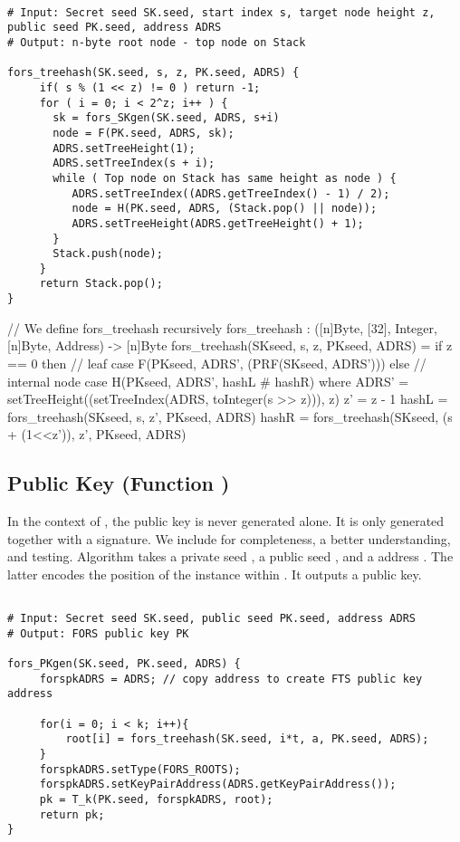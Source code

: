    \begin{lstlisting}[breaklines=true, label=algo:forstreehash, language=pseudoc,
                   caption=The \forstreehash algorithm.]

# Input: Secret seed SK.seed, start index s, target node height z, public seed PK.seed, address ADRS
# Output: n-byte root node - top node on Stack

fors_treehash(SK.seed, s, z, PK.seed, ADRS) {
     if( s % (1 << z) != 0 ) return -1;
     for ( i = 0; i < 2^z; i++ ) {
       sk = fors_SKgen(SK.seed, ADRS, s+i)
       node = F(PK.seed, ADRS, sk);
       ADRS.setTreeHeight(1);
       ADRS.setTreeIndex(s + i);
       while ( Top node on Stack has same height as node ) {
          ADRS.setTreeIndex((ADRS.getTreeIndex() - 1) / 2);
          node = H(PK.seed, ADRS, (Stack.pop() || node));
          ADRS.setTreeHeight(ADRS.getTreeHeight() + 1);
       }
       Stack.push(node);
     }
     return Stack.pop();
}

\end{lstlisting}

\begin{code}
  // We define fors_treehash recursively
  fors_treehash : ([n]Byte, [32], Integer, [n]Byte, Address) -> [n]Byte
  fors_treehash(SKseed, s, z, PKseed, ADRS) =
    if z == 0 then
    // leaf case
      F(PKseed, ADRS', (PRF(SKseed, ADRS')))
    else
      // internal node case
      H(PKseed, ADRS', hashL # hashR)
    where
      ADRS' = setTreeHeight((setTreeIndex(ADRS, toInteger(s >> z))), z)
      z' = z - 1
      hashL = fors_treehash(SKseed, s, z', PKseed, ADRS)
      hashR = fors_treehash(SKseed, (s + (1<<z')), z', PKseed, ADRS)
\end{code}

\subsection{\fors Public Key (Function \forspkgen)}
In the context of \spx, the \fors public key is never generated alone. It is
only generated together with a signature. We include \forspkgen
for completeness, a better understanding, and testing. Algorithm \forspkgen takes
a private seed \sseed, a public seed \pseed, and a \fors address \adrs. The
latter encodes the position of the \fors instance within \spx. It outputs a
\fors public key.

\begin{lstlisting}[label=alg:fors:pkgen, language=pseudoc,
                   caption=\forspkgen\ -- Generate a FORS public key.]

# Input: Secret seed SK.seed, public seed PK.seed, address ADRS
# Output: FORS public key PK

fors_PKgen(SK.seed, PK.seed, ADRS) {
     forspkADRS = ADRS; // copy address to create FTS public key address

     for(i = 0; i < k; i++){
         root[i] = fors_treehash(SK.seed, i*t, a, PK.seed, ADRS);
     }
     forspkADRS.setType(FORS_ROOTS);
     forspkADRS.setKeyPairAddress(ADRS.getKeyPairAddress());
     pk = T_k(PK.seed, forspkADRS, root);
     return pk;
}
\end{lstlisting}

